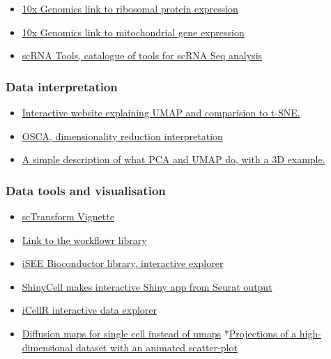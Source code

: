 \documentclass[
]{book}
\providecommand{\tightlist}{%
  \setlength{\itemsep}{0pt}\setlength{\parskip}{0pt}}
\begin{document}
\begin{itemize}
\tightlist
\item
  \href{https://kb.10xgenomics.com/hc/en-us/articles/218169723-What-fraction-of-reads-map-to-ribosomal-proteins-}{10x Genomics link to ribosomal protein expression}
\item
  \href{https://kb.10xgenomics.com/hc/en-us/articles/360001086611-Why-do-I-see-a-high-level-of-mitochondrial-gene-expression-}{10x Genomics link to mitochondrial gene expression}
\item
  \href{https://www.scrna-tools.org/}{scRNA Tools, catalogue of tools for scRNA Seq analysis}
\end{itemize}

\hypertarget{data-interpretation}{%
\subsubsection{Data interpretation}\label{data-interpretation}}

\begin{itemize}
\tightlist
\item
  \href{https://pair-code.github.io/understanding-umap/}{Interactive website explaining UMAP and comparision to t-SNE.}
\item
  \href{http://bioconductor.org/books/3.14/OSCA.basic/dimensionality-reduction.html\#visualization-interpretation}{OSCA, dimensionality reduction interpretation}
\item
  \href{https://logarithmic.net/2023/dimred.html}{A simple description of what PCA and UMAP do, with a 3D example.}
\end{itemize}

\hypertarget{data-tools-and-visualisation}{%
\subsubsection{Data tools and visualisation}\label{data-tools-and-visualisation}}

\begin{itemize}
\tightlist
\item
  \href{https://satijalab.org/seurat/articles/sctransform_vignette.html}{scTransform Vignette}
\item
  \href{https://github.com/jdblischak/workflowr}{Link to the workflowr library}
\item
  \href{https://bioconductor.org/packages/release/bioc/html/iSEE.html}{iSEE Bioconductor library, interactive explorer}
\item
  \href{https://github.com/SGDDNB/ShinyCell}{ShinyCell makes interactive Shiny app from Seurat output}
\item
  \href{https://github.com/rezakj/iCellR}{iCellR interactive data explorer}
\item
  \href{https://www.helmholtz-munich.de/icb/research/groups/marr-lab/software/destiny/index.html}{Diffusion maps for single cell instead of umaps}
  *\href{https://logarithmic.net/langevitour/}{Projections of a high-dimensional dataset with an animated scatter-plot}
\end{itemize}
\end{document}

